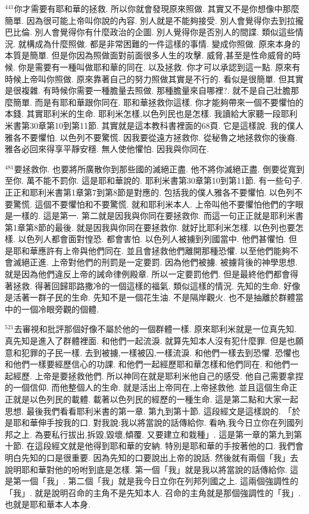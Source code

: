 \documentclass{book}
\begin{document}
$^{441}$你才需要有耶和華的拯救.
所以你就會發現原來照做.
其實又不是你想像中那麼簡單.
因為很可能上帝叫你說的內容.
別人就是不能夠接受.
別人會覺得你去到拉攏巴比倫.
別人會覺得你有什麼政治的企圖.
別人覺得你是否別人的間諜.
類似這些情況.
就構成為什麼照做.
都是非常困難的一件這樣的事情.
變成你照做.
原來本身的本質是簡單.
但是你因為照做面對前面很多人生的攻擊.
威脅,甚至是性命威脅的時候.
你是需要有一種叫做耶和華的同在.
以及拯救.
你才可以承認到這一點.
原來有時候上帝叫你照做.
原來靠著自己的努力照做其實是不行的.
看似是很簡單.
但其實是很複雜.
有時候你需要一種膽量去照做.
那種膽量來自哪裡?.
就不是自己壯膽那麼簡單.
而是有耶和華跟你同在.
耶和華拯救你這樣.
你才能夠帶來一個不要懼怕的本錢.
其實耶利米的生命.
耶利米怎樣,以色列民也是怎樣.
我讀給大家聽一段耶利米書第30章第10到第11節.
其實就是這本教科書裡面的68頁.
它是這樣說.
我的僕人雅各不要懼怕.
以色列不要驚慌.
因我要從遠方拯救你.
從秘魯之地拯救你的後裔.
雅各必回來得享平靜安穩.
無人使他懼怕.
因我與你同在.

$^{481}$要拯救你.
也要將所廣散你到那些國的滅絕正盡.
他不將你滅絕正盡.
倒要從寬到至你.
萬不能不罰你.
這是耶和華說的.
耶利米書第30章第10到第11節.
有一些句子.
正正和耶利米書第1章第7到第8節是對應的.
包括我的僕人雅各不要懼怕.
以色列不要驚慌.
這個不要懼怕和不要驚慌.
就和耶利米本人.
上帝叫他不要懼怕他們的字眼是一樣的.
這是第一.
第二就是因我與你同在要拯救你.
而這一句正正就是耶利米書第1章第8節的最後.
就是因我與你同在要拯救你.
就好比耶利米怎樣.
以色列也要怎樣.
以色列人都會面對惶恐.
都會害怕.
以色列人被擄到列國當中.
他們甚懼怕.
但是耶和華應許有上帝與他們同在.
並且會拯救他們離開那種恐懼.
以至他們能夠不會滅絕正進.
上帝對他們的刑罰是一定要罰.
因為他們被擄.
被擄背後的神學思想.
就是因為他們違反上帝的誡命律例殿章.
所以一定要罰他們.
但是最終他們都會得著拯救.
得著回歸耶路撒冷的一個這樣的福氣.
類似這樣的情況.
先知的生命.
好像是活著一群子民的生命.
先知不是一個花生油.
不是隔岸觀火.
也不是抽離於群體當中的一個冷眼旁觀的個體.

$^{521}$去審視和批評那個好像不屬於他的一個群體一樣.
原來耶利米就是一位真先知.
真先知是進入了群體裡面.
和他們一起流淚.
就算先知本人沒有犯什麼罪.
但是也願意和犯罪的子民一樣.
去到被擄,一樣被囚,一樣流淚.
和他們一樣去到恐懼.
恐懼也和他們一樣要經歷信心的功課.
和他們一起經歷耶和華怎樣和他們同在.
和他們一起經歷.
上帝是要拯救他們.
所以神同在就是耶利米他自己的感受.
他自己需要拿捏的一個信仰.
而他整個人的生命.
就是活出上帝同在,上帝拯救他.
並且這個生命正正就是以色列民的載體.
載著以色列民的經歷的一種生命.
這是第二點和大家一起思想.
最後我們看看耶利米書的第一章.
第九到第十節.
這段經文是這樣說的.
「於是耶和華伸手按我的口.
對我說:我以將當說的話傳給你.
看吶,我今日立你在列國列邦之上.
為要私行拔出,拆毀,毀壞,傾覆.
又要建立和栽種」.
這是第一章的第九到第十節.
在這段經文就是他得到耶和華的安納.
特別是耶和華的手按著他的口.
我們會明白先知的口是很重要.
因為先知的口要說出上帝的說話.
然後就有兩個「我」去說明耶和華對他的吩咐到底是怎樣.
第一個「我」就是我以將當說的話傳給你.
這是第一個「我」.
第二個「我」就是我今日立你在列邦列國之上.
這兩個強調性的「我」.
就是說明召命的主角不是先知本人.
召命的主角就是那個強調性的「我」.
也就是耶和華本人本身.
\end{document}
